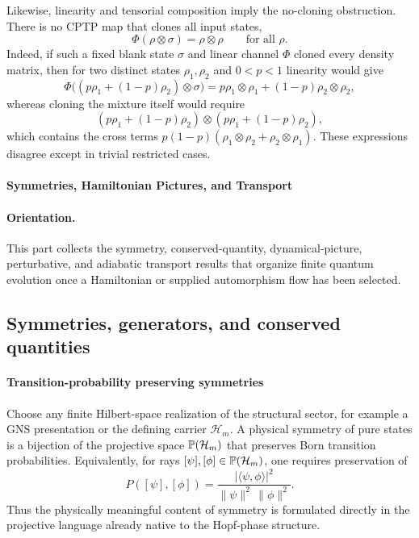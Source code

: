 \documentclass[12pt,a4paper]{article}
\begin{document}
Likewise, linearity and tensorial composition imply the no-cloning obstruction.
There is no CPTP map that clones all input states,
\begin{equation}
\label{p4:eq:nocloning}
\Phi(\rho\otimes\sigma)=\rho\otimes\rho
\qquad
\text{for all }\rho.
\end{equation}
Indeed, if such a fixed blank state $\sigma$ and linear channel $\Phi$ cloned every density matrix, then for two distinct states $\rho_1,\rho_2$ and $0<p<1$ linearity would give
\[
\Phi\bigl((p\rho_1+(1-p)\rho_2)\otimes\sigma\bigr)
=
p\rho_1\otimes\rho_1+(1-p)\rho_2\otimes\rho_2,
\]
whereas cloning the mixture itself would require
\[
(p\rho_1+(1-p)\rho_2)\otimes(p\rho_1+(1-p)\rho_2),
\]
which contains the cross terms $p(1-p)(\rho_1\otimes\rho_2+\rho_2\otimes\rho_1)$.  These expressions disagree except in trivial restricted cases.



\paragraph{Symmetries, Hamiltonian Pictures, and Transport}
\label{p4:part:symmetry-dynamical-pictures}

\paragraph{Orientation.}
This part collects the symmetry, conserved-quantity, dynamical-picture, perturbative, and adiabatic transport results that organize finite quantum evolution once a Hamiltonian or supplied automorphism flow has been selected.



\subsection{Symmetries, generators, and conserved quantities}
\label{p4:sec:part2-symmetry}



\paragraph{Transition-probability preserving symmetries}
\label{p4:sec:part2-wigner}

Choose any finite Hilbert-space realization of the structural sector, for example a GNS presentation or the defining carrier \(\mathcal H_m\).
A physical symmetry of pure states is a bijection of the projective space \(\mathbb{P}(\mathcal H_m)\) that preserves Born transition probabilities.
Equivalently, for rays \([\psi],[\phi]\in\mathbb{P}(\mathcal H_m)\), one requires preservation of
\begin{equation}
\label{p4:eq:transition-prob}
P([\psi],[\phi])
=
\frac{|\langle\psi,\phi\rangle|^2}{\|\psi\|^2\,\|\phi\|^2}.
\end{equation}
Thus the physically meaningful content of symmetry is formulated directly in the projective language already native to the Hopf-phase structure.
\end{document}
